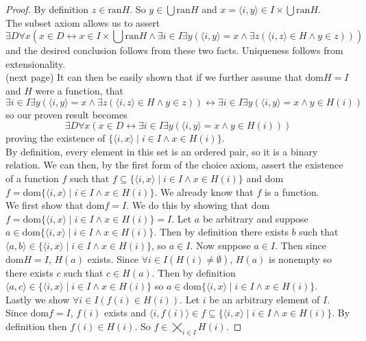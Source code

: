 \documentclass{report}
\begin{document}
\begin{proof}
By definition $z\in\text{ran}H$. So $y\in\bigcup\text{ran}H$ and $x=\langle i,y\rangle\in I\times\bigcup\text{ran}H$.\\
\indent The subset axiom allows us to assert
\begin{equation*}
\exists D\forall x(x\in D\leftrightarrow x\in I\times\bigcup\text{ran}H\land\exists i\in I\exists y(\langle i,y\rangle=x\land\exists z(\langle i,z\rangle\in H\land y\in z)))
\end{equation*}
and the desired conclusion follows from these two facts. Uniqueness follows from extensionality.\\
(next page)\newpage
It can then be easily shown that if we further assume that $\text{dom}H=I$ and $H$ were a function, that
\begin{equation*}
\exists i\in I\exists y(\langle i,y\rangle=x\land\exists z(\langle i,z\rangle\in H\land y\in z))\leftrightarrow\exists i\in I\exists y(\langle i,y\rangle=x\land y\in H(i))
\end{equation*}
so our proven result becomes
\begin{equation*}
\exists D\forall x(x\in D\leftrightarrow\exists i\in I\exists y(\langle i,y\rangle=x\land y\in H(i)))
\end{equation*}
proving the existence of $\{\langle i,x\rangle\mid i\in I\land x\in H(i)\}$.\\
\indent By definition, every element in this set is an ordered pair, so it is a binary relation. We can then, by the first form of the choice axiom, assert the existence of a function $f$ such that 
$f\subseteq\{\langle i,x\rangle\mid i\in I\land x\in H(i)\}$ and dom$f=\text{dom}\{\langle i,x\rangle\mid i\in I\land x\in H(i)\}$. We already know that $f$ is a function.\\
\indent We first show that dom$f=I$.
We do this by showing that dom$f=\text{dom}\{\langle i,x\rangle\mid i\in I\land x\in H(i)\}=I$. Let $a$ be arbitrary and suppose $a\in\text{dom}\{\langle i,x\rangle\mid i\in I\land x\in H(i)\}$.
Then by definition there exists $b$ such that $\langle a,b\rangle\in\{\langle i,x\rangle\mid i\in I\land x\in H(i)\}$, so $a\in I$.
Now suppose $a\in I$. Then since $\text{dom}H=I$, $H(a)$ exists. Since $\forall i\in I(H(i)\neq\emptyset)$, $H(a)$ is nonempty so there exists $c$ such that $c\in H(a)$. 
Then by definition $\langle a,c\rangle\in
\{\langle i,x\rangle\mid i\in I\land x\in H(i)\}$ so $a\in\text{dom}\{\langle i,x\rangle\mid i\in I\land x\in H(i)\}$.\\
\indent Lastly we show $\forall i\in I(f(i)\in H(i))$. Let $i$ be an arbitrary element of $I$.
Since dom$f=I$, $f(i)$ exists and $\langle i,f(i)\rangle\in f\subseteq\{\langle i,x\rangle\mid i\in I\land x\in H(i)\}$.
By definition then $f(i)\in H(i)$. So $f\in\bigtimes_{i\in I}H(i)$.
\end{proof}
\end{document}
